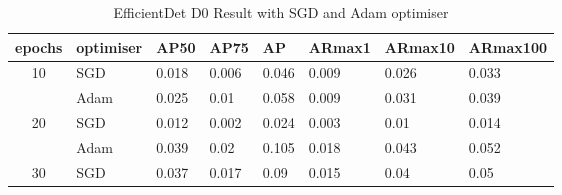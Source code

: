 \documentclass{article}
\begin{document}
\begin{table}
\centering
\setlength{\extrarowheight}{0pt}
\addtolength{\extrarowheight}{\aboverulesep}
\addtolength{\extrarowheight}{\belowrulesep}
\setlength{\aboverulesep}{0pt}
\setlength{\belowrulesep}{0pt}
\caption{EfficientDet D0 Result with SGD and Adam optimiser}
\begin{tabular}{cl|llllll} 
\toprule
\multicolumn{1}{l}{epochs} & optimiser                               & AP50                                      & AP75                                      & AP                                        & ARmax1                                    & ARmax10                                   & ARmax100                                   \\ 
\hline
\multirow{2}{*}{10}        & {\cellcolor[rgb]{0.788,0.788,0.788}}SGD & {\cellcolor[rgb]{0.788,0.788,0.788}}0.018 & {\cellcolor[rgb]{0.788,0.788,0.788}}0.006 & {\cellcolor[rgb]{0.788,0.788,0.788}}0.046 & {\cellcolor[rgb]{0.788,0.788,0.788}}0.009 & {\cellcolor[rgb]{0.788,0.788,0.788}}0.026 & {\cellcolor[rgb]{0.788,0.788,0.788}}0.033  \\
                           & Adam                                    & 0.025                                     & 0.01                                      & 0.058                                     & 0.009                                     & 0.031                                     & 0.039                                      \\
\multirow{2}{*}{20}        & {\cellcolor[rgb]{0.788,0.788,0.788}}SGD & {\cellcolor[rgb]{0.788,0.788,0.788}}0.012 & {\cellcolor[rgb]{0.788,0.788,0.788}}0.002 & {\cellcolor[rgb]{0.788,0.788,0.788}}0.024 & {\cellcolor[rgb]{0.788,0.788,0.788}}0.003 & {\cellcolor[rgb]{0.788,0.788,0.788}}0.01  & {\cellcolor[rgb]{0.788,0.788,0.788}}0.014  \\
                           & Adam                                    & 0.039                                     & 0.02                                      & 0.105                                     & 0.018                                     & 0.043                                     & 0.052                                      \\
\multirow{2}{*}{30}        & {\cellcolor[rgb]{0.788,0.788,0.788}}SGD & {\cellcolor[rgb]{0.788,0.788,0.788}}0.037 & {\cellcolor[rgb]{0.788,0.788,0.788}}0.017 & {\cellcolor[rgb]{0.788,0.788,0.788}}0.09  & {\cellcolor[rgb]{0.788,0.788,0.788}}0.015 & {\cellcolor[rgb]{0.788,0.788,0.788}}0.04  & {\cellcolor[rgb]{0.788,0.788,0.788}}0.05   \\

\end{tabular}
\end{table}
\end{document}
